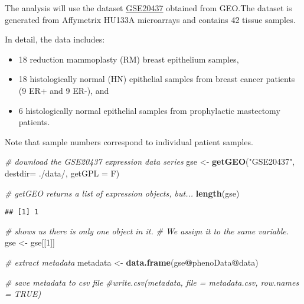 \documentclass[
]{article}
\newenvironment{Shaded}{\begin{snugshade}}{\end{snugshade}}
\newcommand{\AttributeTok}[1]{\textcolor[rgb]{0.13,0.29,0.53}{#1}}
\newcommand{\CommentTok}[1]{\textcolor[rgb]{0.56,0.35,0.01}{\textit{#1}}}
\newcommand{\DecValTok}[1]{\textcolor[rgb]{0.00,0.00,0.81}{#1}}
\newcommand{\FunctionTok}[1]{\textcolor[rgb]{0.13,0.29,0.53}{\textbf{#1}}}
\newcommand{\NormalTok}[1]{#1}
\newcommand{\OtherTok}[1]{\textcolor[rgb]{0.56,0.35,0.01}{#1}}
\newcommand{\SpecialCharTok}[1]{\textcolor[rgb]{0.81,0.36,0.00}{\textbf{#1}}}
\newcommand{\StringTok}[1]{\textcolor[rgb]{0.31,0.60,0.02}{#1}}
\begin{document}
The analysis will use the dataset
\href{https://www.ncbi.nlm.nih.gov/geo/query/acc.cgi?acc=GSE20437}{GSE20437}
obtained from GEO.The dataset is generated from Affymetrix HU133A
microarrays and contains 42 tissue samples.

In detail, the data includes:

\begin{itemize}
\item
  18 reduction mammoplasty (RM) breast epithelium samples,
\item
  18 histologically normal (HN) epithelial samples from breast cancer
  patients (9 ER+ and 9 ER-), and
\item
  6 histologically normal epithelial samples from prophylactic
  mastectomy patients.
\end{itemize}

Note that sample numbers correspond to individual patient samples.

\begin{Shaded}
\begin{Highlighting}[]
\CommentTok{\# download the GSE20437 expression data series}
\NormalTok{gse }\OtherTok{\textless{}{-}} \FunctionTok{getGEO}\NormalTok{(}\StringTok{"GSE20437"}\NormalTok{, }\AttributeTok{destdir=} \StringTok{\textquotesingle{}./data/\textquotesingle{}}\NormalTok{, }\AttributeTok{getGPL =}\NormalTok{ F)}
\end{Highlighting}
\end{Shaded}

\begin{Shaded}
\begin{Highlighting}[]
\CommentTok{\# getGEO returns a list of expression objects, but...}
\FunctionTok{length}\NormalTok{(gse) }
\end{Highlighting}
\end{Shaded}

\begin{verbatim}
## [1] 1
\end{verbatim}

\begin{Shaded}
\begin{Highlighting}[]
\CommentTok{\# shows us there is only one object in it. }
\CommentTok{\# We assign it to the same variable.}
\NormalTok{gse }\OtherTok{\textless{}{-}}\NormalTok{ gse[[}\DecValTok{1}\NormalTok{]]}
\end{Highlighting}
\end{Shaded}

\begin{Shaded}
\begin{Highlighting}[]
\CommentTok{\# extract metadata}
\NormalTok{metadata }\OtherTok{\textless{}{-}} \FunctionTok{data.frame}\NormalTok{(gse}\SpecialCharTok{@}\NormalTok{phenoData}\SpecialCharTok{@}\NormalTok{data)}

\CommentTok{\# save metadata to csv file}
\CommentTok{\#write.csv(metadata, file = \textquotesingle{}metadata.csv\textquotesingle{}, row.names = TRUE)}
\end{Highlighting}
\end{Shaded}
\end{document}
